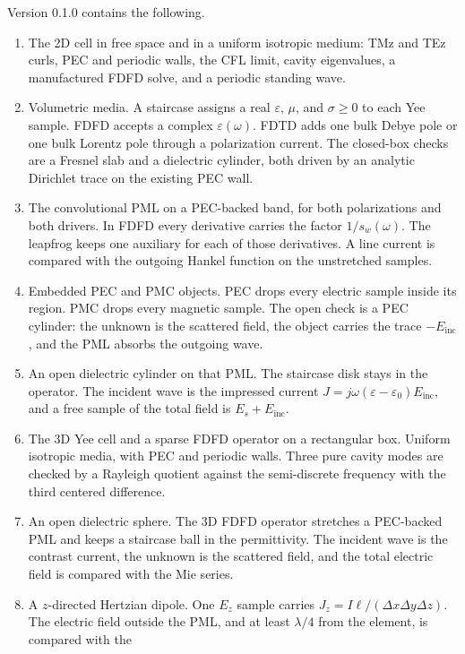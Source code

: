 \documentclass[11pt,a4paper]{article}
\begin{document}
Version 0.1.0 contains the following.

\begin{enumerate}
\item The 2D cell in free space and in a uniform isotropic medium: TMz and
TEz curls, PEC and periodic walls, the CFL limit, cavity eigenvalues, a
manufactured FDFD solve, and a periodic standing wave.
\item Volumetric media. A staircase assigns a real $\varepsilon$, $\mu$, and
$\sigma\ge 0$ to each Yee sample. FDFD accepts a complex
$\varepsilon(\omega)$. FDTD adds one bulk Debye pole or one bulk Lorentz
pole through a polarization current. The closed-box checks are a Fresnel
slab and a dielectric cylinder, both driven by an analytic Dirichlet trace
on the existing PEC wall.
\item The convolutional PML on a PEC-backed band, for both polarizations
and both drivers. In FDFD every derivative carries the factor
$1/s_w(\omega)$. The leapfrog keeps one auxiliary for each of those
derivatives. A line current is compared with the outgoing Hankel function
on the unstretched samples.
\item Embedded PEC and PMC objects. PEC drops every electric sample inside
its region. PMC drops every magnetic sample. The open check is a PEC
cylinder: the unknown is the scattered field, the object carries the trace
$-E_{\mathrm{inc}}$, and the PML absorbs the outgoing wave.
\item An open dielectric cylinder on that PML. The staircase disk stays in
the operator. The incident wave is the impressed current
$J=j\omega(\varepsilon-\varepsilon_0)E_{\mathrm{inc}}$, and a free sample
of the total field is $E_s+E_{\mathrm{inc}}$.
\item The 3D Yee cell and a sparse FDFD operator on a rectangular box.
Uniform isotropic media, with PEC and periodic walls. Three pure cavity
modes are checked by a Rayleigh quotient against the semi-discrete
frequency with the third centered difference.
\item An open dielectric sphere. The 3D FDFD operator stretches a
PEC-backed PML and keeps a staircase ball in the permittivity. The
incident wave is the contrast current, the unknown is the scattered
field, and the total electric field is compared with the Mie series.
\item A $z$-directed Hertzian dipole. One $E_z$ sample carries
$J_z=I\ell/(\Delta x\Delta y\Delta z)$. The electric field outside the
PML, and at least $\lambda/4$ from the element, is compared with the

\end{enumerate}
\end{document}
